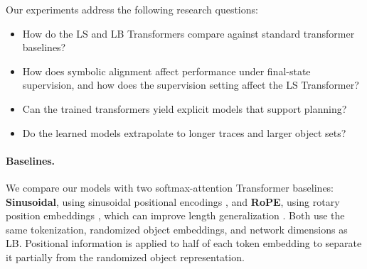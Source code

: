 \label{sec:experiments}
Our experiments address the following research questions:
\begin{itemize}
    \item[\textbf{RQ1:}] How do the LS and LB Transformers compare against standard transformer baselines?
    \item[\textbf{RQ2:}] How does symbolic alignment affect performance under final-state supervision, and how does the supervision setting affect the LS Transformer?
    \item[\textbf{RQ3:}] Can the trained transformers yield explicit \strips models that support planning?
    \item[\textbf{RQ4:}] Do the learned models extrapolate to longer traces and larger object sets?
\end{itemize}
\paragraph{Baselines.}
We compare our models with two softmax-attention Transformer baselines:
\textbf{Sinusoidal}, using sinusoidal positional encodings
\citep{transformers}, and
\textbf{RoPE}, using rotary position embeddings
\citep{su2024roformer}, which can improve length generalization
\citep{spies2025transformers}.
Both use the same tokenization, randomized object embeddings, and network
dimensions as LB.
Positional information is applied to half of each token embedding to separate
it partially from the randomized object representation.
